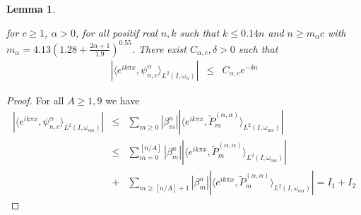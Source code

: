 \documentclass[]{article}
\newtheorem{lemma}{Lemma}
\newcounter{rea}
\begin{document}
\begin{lemma} \label{decaycoeff}
	
	for $c\geq1$, $\alpha>0$,  for all positif real $n,k$ such that $k\leq 0.14n$ and $n\geq m_{\alpha}c$ with $m_{\alpha}=4.13\left(1.28+\frac{2\alpha+1}{1.9}\right)^{0.55}$.
	There exist $C_{\alpha,c},\delta>0$ such that
	\begin{eqnarray}
	|\langle e^{ik\pi x}, \psi_{n,c}^{\alpha}\rangle _{L^2(I,\omega_{\alpha})}| &\leq& C_{\alpha,c} e^{-\delta n}
	\end{eqnarray}
	
\end{lemma}
\begin{proof}
For all $A\geq 1,9 $	we have
	\begin{eqnarray}
	|\langle e^{ik\pi x}, \psi_{n,c}^{\alpha}\rangle _{L^2(I,\omega_{\alpha\alpha})}| &\leq& \displaystyle{ \sum_{m\geq 0} } |\beta_m^n||\langle e^{ik\pi x}, \tilde{P}_{m}^{(\alpha,\alpha)}\rangle _{L^2(I,\omega_{\alpha\alpha})}|\nonumber\\
	&\leq& \displaystyle {\sum_{m= 0} ^{[n/A]}}|\beta_m^n||\langle e^{ik\pi x}, \tilde{P}_{m}^{(\alpha,\alpha)}\rangle _{L^2(I,\omega_{\alpha\alpha})}| \nonumber \\
	&+ &    \displaystyle{ \sum_{m\geq {[n/A]}+1}} |\beta_m^n||\langle e^{ik\pi x}, \tilde{P}_{m}^{(\alpha,\alpha)}\rangle _{L^2(I,\omega_{\alpha\alpha})}| =I_1 +I_2
	\end{eqnarray}
	

\end{proof}
\end{document}
